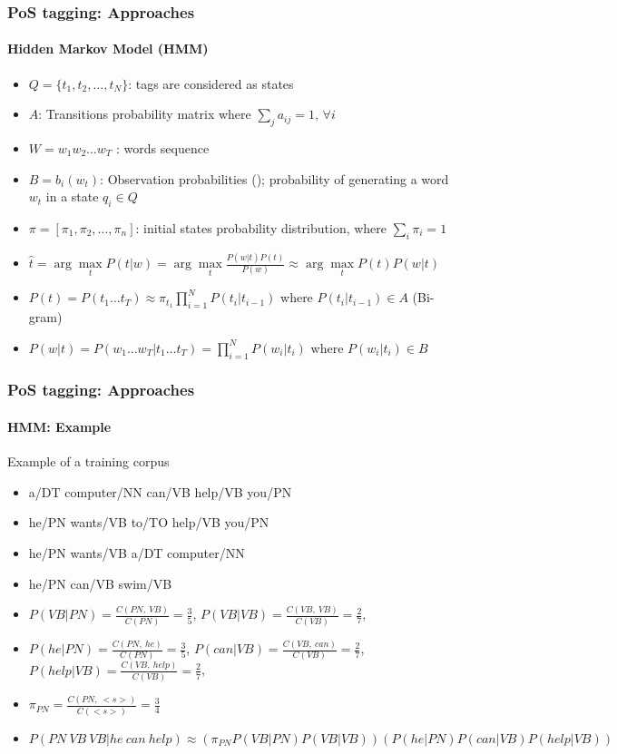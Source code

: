 \documentclass[xcolor=table]{beamer}
\begin{document}
\begin{frame}[fragile]
\frametitle{PoS tagging: Approaches}
\framesubtitle{Hidden Markov Model (HMM)}

\begin{itemize}
	\item $Q = \{t_1, t_2, \ldots, t_N\}$: tags are considered as states
	\item $A$: Transitions probability matrix where $\sum_j a_{ij} = 1,\, \forall i$
	\item $W = w_1 w_2 \ldots w_T$ : words sequence
	\item $B = b_i(w_t)$: Observation probabilities (); probability of generating a word $w_t$ in a state $q_i \in Q$
	\item $\pi = [\pi_1, \pi_2, \ldots, \pi_n ]$: initial states probability distribution, where $\sum_i \pi_i = 1$
	
	\item $\hat{t} = \arg\max\limits_t P(t | w) = \arg\max\limits_t \frac{P(w|t) P(t)}{P(w)} \approx \arg\max\limits_t P(t) P(w|t)$
	\item $P(t) = P(t_1 \ldots t_T) \approx \pi_{t_1} \prod\limits_{i=1}^N P(t_i|t_{i-1}) $ where $P(t_i|t_{i-1}) \in A$ (Bi-gram) 
	\item $P(w|t) = P(w_1 \ldots w_T|t_1 \ldots t_T) = \prod\limits_{i=1}^N P(w_i|t_i) $ where $P(w_i|t_i) \in B$
\end{itemize}



\end{frame}

\begin{frame}
\frametitle{PoS tagging: Approaches}
\framesubtitle{HMM: Example}

\begin{exampleblock}{Example of a training corpus}
	\begin{itemize}
		\item a/DT computer/NN can/VB help/VB you/PN
		\item he/PN wants/VB to/TO help/VB you/PN
		\item he/PN wants/VB a/DT computer/NN
		\item he/PN can/VB swim/VB
	\end{itemize}
\end{exampleblock}

\begin{itemize}
	\item $P(VB | PN) = \frac{C(PN,\ VB)}{C(PN)} = \frac{3}{5}$, 
		  $P(VB | VB) = \frac{C(VB,\ VB)}{C(VB)} = \frac{2}{7}$,
	\item $P(he | PN) = \frac{C(PN,\ he)}{C(PN)} = \frac{3}{5}$,
	      $P(can | VB) = \frac{C(VB,\ can)}{C(VB)} = \frac{2}{7}$,
		  $P(help | VB) = \frac{C(VB,\ help)}{C(VB)} = \frac{2}{7}$,
	\item $\pi_{PN} = \frac{C(PN,\ <s>)}{C(<s>)} = \frac{3}{4} $
	\item \scriptsize $P(PN\ VB\ VB | he\ can\ help) \approx (\pi_{PN} P(VB | PN) P(VB | VB)) (P(he | PN) P(can | VB) P(help | VB)) $
\end{itemize}

\end{frame}
\end{document}
